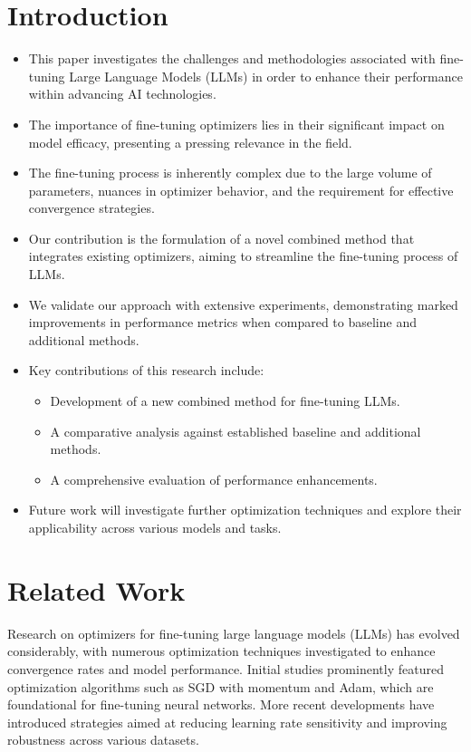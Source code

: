\documentclass{article} %
\begin{document}
\section{Introduction}
\label{sec:intro}
\begin{itemize}
\item This paper investigates the challenges and methodologies associated with fine-tuning Large Language Models (LLMs) in order to enhance their performance within advancing AI technologies.
\item The importance of fine-tuning optimizers lies in their significant impact on model efficacy, presenting a pressing relevance in the field.
\item The fine-tuning process is inherently complex due to the large volume of parameters, nuances in optimizer behavior, and the requirement for effective convergence strategies.
\item Our contribution is the formulation of a novel combined method that integrates existing optimizers, aiming to streamline the fine-tuning process of LLMs.
\item We validate our approach with extensive experiments, demonstrating marked improvements in performance metrics when compared to baseline and additional methods.
\item Key contributions of this research include:
\begin{itemize}
\item Development of a new combined method for fine-tuning LLMs.
\item A comparative analysis against established baseline and additional methods.
\item A comprehensive evaluation of performance enhancements.
\end{itemize}
\item Future work will investigate further optimization techniques and explore their applicability across various models and tasks.
\end{itemize}

\section{Related Work}
\label{sec:related}
Research on optimizers for fine-tuning large language models (LLMs) has evolved considerably, with numerous optimization techniques investigated to enhance convergence rates and model performance. Initial studies prominently featured optimization algorithms such as SGD with momentum and Adam, which are foundational for fine-tuning neural networks. More recent developments have introduced strategies aimed at reducing learning rate sensitivity and improving robustness across various datasets.
\end{document}
